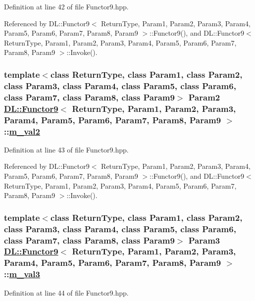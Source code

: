 Definition at line 42 of file Functor9.hpp.

Referenced by DL::Functor9$<$ Return\-Type, Param1, Param2, Param3, Param4, Param5, Param6, Param7, Param8, Param9 $>$::Functor9(), and DL::Functor9$<$ Return\-Type, Param1, Param2, Param3, Param4, Param5, Param6, Param7, Param8, Param9 $>$::Invoke().\hypertarget{classDL_1_1Functor9_r2}{
\subsubsection[m\_\-val2]{\setlength{\rightskip}{0pt plus 5cm}template$<$class Return\-Type, class Param1, class Param2, class Param3, class Param4, class Param5, class Param6, class Param7, class Param8, class Param9$>$ Param2 \hyperlink{classDL_1_1Functor9}{DL::Functor9}$<$ Return\-Type, Param1, Param2, Param3, Param4, Param5, Param6, Param7, Param8, Param9 $>$::\hyperlink{classDL_1_1Functor9_r2}{m\_\-val2}}}
\label{classDL_1_1Functor9_r2}




Definition at line 43 of file Functor9.hpp.

Referenced by DL::Functor9$<$ Return\-Type, Param1, Param2, Param3, Param4, Param5, Param6, Param7, Param8, Param9 $>$::Functor9(), and DL::Functor9$<$ Return\-Type, Param1, Param2, Param3, Param4, Param5, Param6, Param7, Param8, Param9 $>$::Invoke().\hypertarget{classDL_1_1Functor9_r3}{
\subsubsection[m\_\-val3]{\setlength{\rightskip}{0pt plus 5cm}template$<$class Return\-Type, class Param1, class Param2, class Param3, class Param4, class Param5, class Param6, class Param7, class Param8, class Param9$>$ Param3 \hyperlink{classDL_1_1Functor9}{DL::Functor9}$<$ Return\-Type, Param1, Param2, Param3, Param4, Param5, Param6, Param7, Param8, Param9 $>$::\hyperlink{classDL_1_1Functor9_r3}{m\_\-val3}}}
\label{classDL_1_1Functor9_r3}




Definition at line 44 of file Functor9.hpp.

